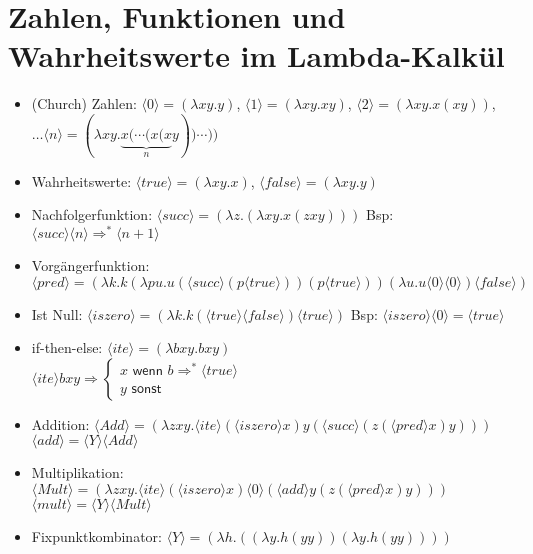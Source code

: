 \documentclass[a4paper,10pt]{scrartcl}
\begin{document}
\section*{Zahlen, Funktionen und Wahrheitswerte im Lambda-Kalkül}
\begin{itemize}
  \item (Church) Zahlen: 
  $\langle 0 \rangle = (λxy.y)$, $\langle 1\rangle = (λxy.xy)$, $\langle 2\rangle = (λxy.x(xy))$, $\ldots \langle n\rangle = (λxy.\underbrace{x(\cdots (x(x}_{n}y))\cdots))$
  \item Wahrheitswerte: $\langle true\rangle = (λxy.x)$, $\langle false\rangle = (λxy.y)$
  \item Nachfolgerfunktion: $\langle succ\rangle = (λz.(λxy.x(zxy)))$ Bsp: $\langle succ\rangle\langle n\rangle \Rightarrow^{*} \langle n +1 \rangle$
  \item Vorgängerfunktion: $ \langle pred \rangle = (λk.k(λpu.u(\langle succ\rangle(p\langle true\rangle))(p\langle true\rangle))(λu.u\langle 0\rangle\langle 0\rangle) \langle false\rangle)$
  \item Ist Null: $\langle iszero \rangle = (λk.k(\langle true\rangle \langle false\rangle )\langle true\rangle )$ Bsp: $\langle iszero\rangle \langle 0\rangle  = \langle true\rangle $
  \item if-then-else: $\langle ite\rangle  = (λbxy.bxy)$\\
  $\langle ite\rangle  b x y \Rightarrow \left\{\begin{matrix} x \textsf{ wenn } b \Rightarrow^{*} \langle true\rangle  \\ y \textsf{ sonst } \end{matrix}\right.$
  \item Addition: $\langle Add\rangle  =(λzxy.\langle ite\rangle (\langle iszero\rangle x)y(\langle succ\rangle  (z(\langle pred\rangle x)y)))$\\
  $\langle add\rangle  = \langle Y\rangle  \langle Add\rangle $
  \item Multiplikation: $\langle Mult\rangle  = (λzxy.\langle ite\rangle (\langle iszero\rangle x)\langle 0\rangle (\langle add\rangle y(z(\langle pred\rangle x)y)))$\\
  $\langle mult\rangle  = \langle Y\rangle \langle Mult\rangle $
  
  \item Fixpunktkombinator: $\langle Y\rangle = (λh.((λy.h(yy))(λy.h(yy)))) $
\end{itemize}
\end{document}
